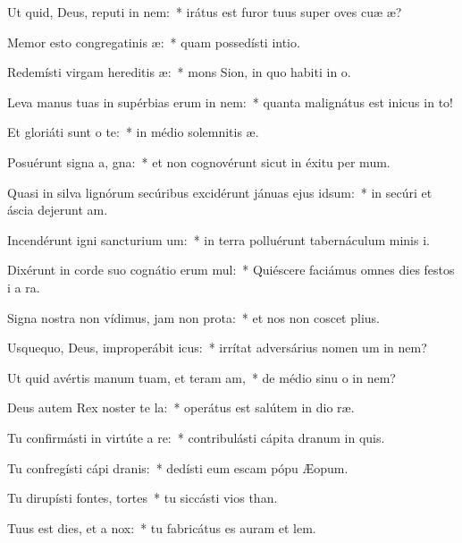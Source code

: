 \item Ut quid, Deus, reputi in nem:~* irátus est furor tuus super oves cuæ æ?
\item Memor esto congregatinis æ:~* quam possedísti  intio.
\item Redemísti virgam hereditis æ:~* mons Sion, in quo habiti in o.
\item Leva manus tuas in supérbias erum in nem:~* quanta malignátus est inicus in to!
\item Et gloriáti sunt  o te:~* in médio solemnitis æ.
\item Posuérunt signa a, gna:~* et non cognovérunt sicut in éxitu per mum.
\item Quasi in silva lignórum secúribus excidérunt jánuas ejus  idsum:~* in secúri et áscia dejerunt am.
\item Incendérunt igni sancturium um:~* in terra polluérunt tabernáculum minis i.
\item Dixérunt in corde suo cognátio erum mul:~* Quiéscere faciámus omnes dies festos i a ra.
\item Signa nostra non vídimus, jam non  prota:~* et nos non coscet plius.
\item Usquequo, Deus, improperábit icus:~* irrítat adversárius nomen um in nem?
\item Ut quid avértis manum tuam, et teram am,~* de médio sinu o in nem?
\item Deus autem Rex noster te la:~* operátus est salútem in dio ræ.
\item Tu confirmásti in virtúte a re:~* contribulásti cápita dranum in quis.
\item Tu confregísti cápi dranis:~* dedísti eum escam pópu Æopum.
\item Tu dirupísti fontes,  tortes~* tu siccásti vios than.
\item Tuus est dies, et a  nox:~* tu fabricátus es auram et lem.
